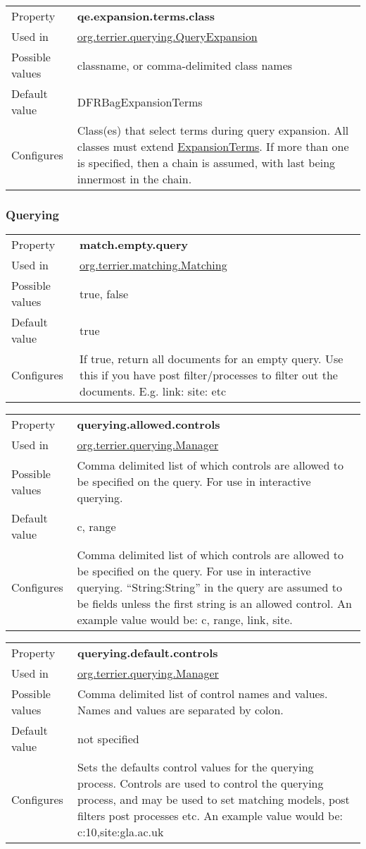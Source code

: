 \begin{longtable}[]{@{}ll@{}}
\toprule
Property & \textbf{qe.expansion.terms.class}\tabularnewline
Used in &
\href{javadoc/org/terrier/querying/QueryExpansion.html}{org.terrier.querying.QueryExpansion}\tabularnewline
Possible values & classname, or comma-delimited class
names\tabularnewline
Default value & DFRBagExpansionTerms\tabularnewline
Configures & Class(es) that select terms during query expansion. All
classes must extend
\href{javadoc/org/terrier/querying/ExpansionTerms.html}{ExpansionTerms}.
If more than one is specified, then a chain is assumed, with last being
innermost in the chain.\tabularnewline
\bottomrule
\end{longtable}

\subsubsection{Querying}\label{querying}

\begin{longtable}[]{@{}ll@{}}
\toprule
Property & \textbf{match.empty.query}\tabularnewline
Used in &
\href{javadoc/org/terrier/matching/Matching.html}{org.terrier.matching.Matching}\tabularnewline
Possible values & true, false\tabularnewline
Default value & true\tabularnewline
Configures & If true, return all documents for an empty query. Use this
if you have post filter/processes to filter out the documents. E.g.
link: site: etc\tabularnewline
\bottomrule
\end{longtable}

\begin{longtable}[]{@{}ll@{}}
\toprule
Property & \textbf{querying.allowed.controls}\tabularnewline
Used in &
\href{javadoc/org/terrier/querying/Manager.html}{org.terrier.querying.Manager}\tabularnewline
Possible values & Comma delimited list of which controls are allowed to
be specified on the query. For use in interactive
querying.\tabularnewline
Default value & c, range\tabularnewline
Configures & Comma delimited list of which controls are allowed to be
specified on the query. For use in interactive querying.
``String:String'' in the query are assumed to be fields unless the first
string is an allowed control. An example value would be: c, range, link,
site.\tabularnewline
\bottomrule
\end{longtable}

\begin{longtable}[]{@{}ll@{}}
\toprule
Property & \textbf{querying.default.controls}\tabularnewline
Used in &
\href{javadoc/org/terrier/querying/Manager.html}{org.terrier.querying.Manager}\tabularnewline
Possible values & Comma delimited list of control names and values.
Names and values are separated by colon.\tabularnewline
Default value & not specified\tabularnewline
Configures & Sets the defaults control values for the querying process.
Controls are used to control the querying process, and may be used to
set matching models, post filters post processes etc. An example value
would be: c:10,site:gla.ac.uk\tabularnewline
\bottomrule
\end{longtable}

